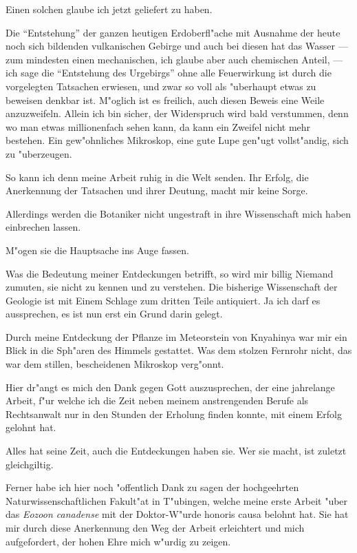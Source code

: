 \documentclass[a4paper, 11pt, oneside, german]{article}
\begin{document}
Einen solchen glaube ich jetzt geliefert zu haben.

Die "`Entstehung"' der ganzen heutigen Erdoberfl"ache mit Ausnahme der heute noch sich bildenden vulkanischen Gebirge und auch bei diesen hat das Wasser --- zum mindesten einen mechanischen, ich glaube aber auch chemischen Anteil, --- ich sage die "`Entstehung des Urgebirgs"' ohne alle Feuerwirkung ist durch die vorgelegten Tatsachen erwiesen, und zwar so voll als "uberhaupt etwas zu beweisen denkbar ist. M"oglich ist es freilich, auch diesen Beweis eine Weile anzuzweifeln. Allein ich bin sicher, der Widerspruch wird bald verstummen, denn wo man etwas millionenfach sehen kann, da kann ein Zweifel nicht mehr bestehen. Ein gew"ohnliches Mikroskop, eine gute Lupe gen"ugt vollst"andig, sich zu "uberzeugen.

So kann ich denn meine Arbeit ruhig in die Welt senden. Ihr Erfolg, die Anerkennung der Tatsachen und ihrer Deutung, macht mir keine Sorge.

Allerdings werden die Botaniker nicht ungestraft in ihre Wissenschaft mich haben einbrechen lassen.

M"ogen sie die Hauptsache ins Auge fassen.

Was die Bedeutung meiner Entdeckungen betrifft, so wird mir billig Niemand zumuten, sie nicht zu kennen und zu verstehen. Die bisherige Wissenschaft der Geologie ist mit Einem Schlage zum dritten Teile antiquiert. Ja ich darf es aussprechen, es ist nun erst ein Grund darin gelegt.

Durch meine Entdeckung der Pflanze im Meteorstein von Knyahinya war mir ein Blick in die Sph"aren des Himmels gestattet. Was dem stolzen Fernrohr nicht, das war dem stillen, bescheidenen Mikroskop verg"onnt.

Hier dr"angt es mich den Dank gegen Gott auszusprechen, der eine jahrelange Arbeit, f"ur welche ich die Zeit neben meinem anstrengenden Berufe als Rechtsanwalt nur in den Stunden der Erholung finden konnte, mit einem Erfolg gelohnt hat.

Alles hat seine Zeit, auch die Entdeckungen haben sie. Wer sie macht, ist zuletzt gleichgiltig.

Ferner habe ich hier noch "offentlich Dank zu sagen der hochgeehrten Naturwissenschaftlichen Fakult"at in T"ubingen, welche meine erste Arbeit "uber das \emph{Eozoon canadense} mit der Doktor-W"urde honoris causa belohnt hat. Sie hat mir durch diese Anerkennung den Weg der Arbeit erleichtert und mich aufgefordert, der hohen Ehre mich w"urdig zu zeigen.
\end{document}
